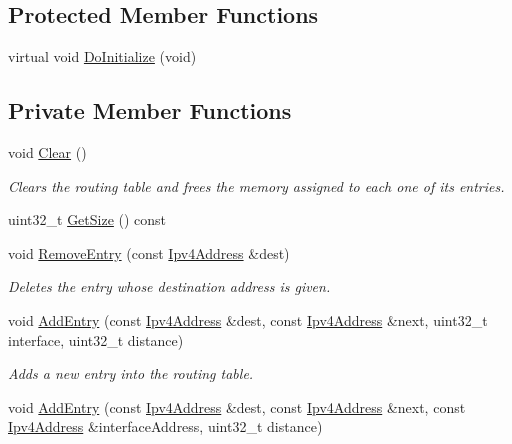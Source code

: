 \subsection*{Protected Member Functions}
\begin{DoxyCompactItemize}
\item 
virtual void \hyperlink{classns3_1_1olsr_1_1RoutingProtocol_afe5419799e8d38ee32d82615de55ef22}{Do\+Initialize} (void)
\end{DoxyCompactItemize}
\subsection*{Private Member Functions}
\begin{DoxyCompactItemize}
\item 
void \hyperlink{classns3_1_1olsr_1_1RoutingProtocol_a91a0babaefcd493c649fceb4fb1a2e60}{Clear} ()
\begin{DoxyCompactList}\small\item\em Clears the routing table and frees the memory assigned to each one of its entries. \end{DoxyCompactList}\item 
uint32\+\_\+t \hyperlink{classns3_1_1olsr_1_1RoutingProtocol_afbbc663c6c3e814b0a71aa4b44312abb}{Get\+Size} () const 
\item 
void \hyperlink{classns3_1_1olsr_1_1RoutingProtocol_a9a1bd13a5259f062ede82512067545c1}{Remove\+Entry} (const \hyperlink{classns3_1_1Ipv4Address}{Ipv4\+Address} \&dest)
\begin{DoxyCompactList}\small\item\em Deletes the entry whose destination address is given. \end{DoxyCompactList}\item 
void \hyperlink{classns3_1_1olsr_1_1RoutingProtocol_a6ddb7dd3a6584b7d88dc5a41a61b1494}{Add\+Entry} (const \hyperlink{classns3_1_1Ipv4Address}{Ipv4\+Address} \&dest, const \hyperlink{classns3_1_1Ipv4Address}{Ipv4\+Address} \&next, uint32\+\_\+t interface, uint32\+\_\+t distance)
\begin{DoxyCompactList}\small\item\em Adds a new entry into the routing table. \end{DoxyCompactList}\item 
void \hyperlink{classns3_1_1olsr_1_1RoutingProtocol_a7f5674689d4265d024379f9c7650ea07}{Add\+Entry} (const \hyperlink{classns3_1_1Ipv4Address}{Ipv4\+Address} \&dest, const \hyperlink{classns3_1_1Ipv4Address}{Ipv4\+Address} \&next, const \hyperlink{classns3_1_1Ipv4Address}{Ipv4\+Address} \&interface\+Address, uint32\+\_\+t distance)

\end{DoxyCompactItemize}

